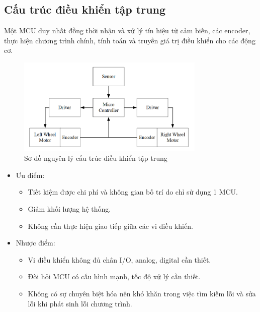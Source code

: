     \subsection{Cấu trúc điều khiển tập trung}
    \hspace*{0.6cm} Một MCU duy nhất đồng thời nhận và xử lý tín hiệu từ cảm biến, các encoder,
    thực hiện chương trình chính, tính toán và truyền giá trị điều khiển cho các động cơ.
    \begin{figure}[H]
        \centering
        \includegraphics[width=0.8\textwidth]{pictures/chapter1/chapter1_pic20_taptrung.png}
        \caption{Sơ đồ nguyên lý cấu trúc điều khiển tập trung}
        \label{chap1_pic20}
    \end{figure}
    \begin{itemize}
        \item Ưu điểm: 
        \begin{itemize}[label=\textendash]
            \item Tiết kiệm được chi phí và không gian bố trí do chỉ sử dụng 1 MCU.
            \item Giảm khối lượng hệ thống.
            \item Không cần thực hiện giao tiếp giữa các vi điều khiển.
        \end{itemize}
        \item Nhược điểm: 
        \begin{itemize}[label=\textendash]
            \item Vi điều khiển không đủ chân I/O, analog, digital cần thiết.
            \item Đòi hỏi MCU có cấu hình mạnh, tốc độ xử lý cần thiết.
            \item Không có sự chuyên biệt hóa nên khó khăn trong việc tìm kiếm lỗi và sửa lỗi khi
            phát sinh lỗi chương trình.
        \end{itemize}
    \end{itemize}



